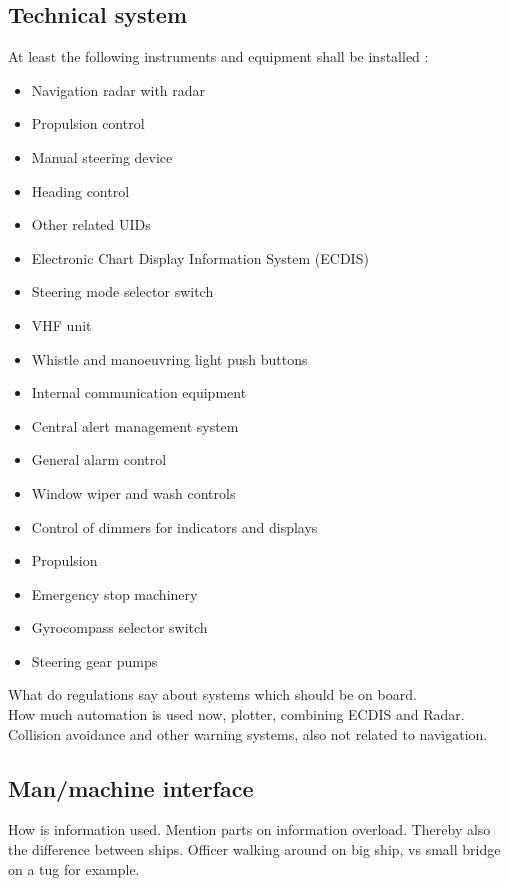 \subsection{Technical system}
At least the following instruments and equipment shall be installed \cite{DNVGL2011}: 
\begin{multicols}{2}
	\begin{itemize}
		\item Navigation radar with radar
		\item Propulsion control
		\item Manual steering device
		\item Heading control
		\item Other related \ac{UID}s
		\item Electronic Chart Display Information System (ECDIS)
		\item Steering mode selector switch
		\item VHF unit
		\item Whistle and manoeuvring light push buttons
		\item Internal communication equipment
		\item Central alert management system
		\item General alarm control
		\item Window wiper and wash controls
		\item Control of dimmers for indicators and displays
		\item Propulsion
		\item Emergency stop machinery
		\item Gyrocompass selector switch
		\item Steering gear pumps
	\end{itemize}
\end{multicols}

What do regulations say about systems which should be on board. \\
How much automation is used now, plotter, combining ECDIS and Radar. \\
Collision avoidance and other warning systems, also not related to navigation.


\subsection{Man/machine interface}
How is information used. Mention parts on information overload. Thereby also the difference between ships. Officer walking around on big ship, vs small bridge on a tug for example.

